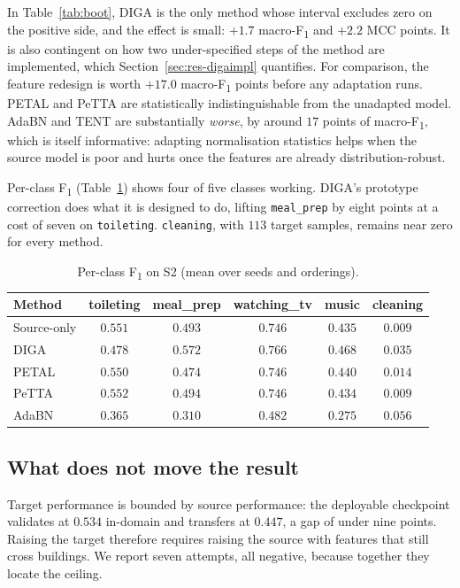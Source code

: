 \documentclass[a4paper,fleqn]{cas-dc}
\newcommand{\macf}{macro-F\textsubscript{1}}
\begin{document}
In Table~\ref{tab:boot}, DIGA is the only method whose interval excludes zero on the
positive side, and the effect is small: $+1.7$ \macf{} and $+2.2$ MCC points. It is also
contingent on how two under-specified steps of the method are implemented, which
Section~\ref{sec:res-digaimpl} quantifies. For comparison, the feature redesign is
worth $+17.0$ \macf{} points before any adaptation runs. PETAL and PeTTA are statistically
indistinguishable from the unadapted model. AdaBN and TENT are substantially
\emph{worse}, by around $17$ points of \macf{}, which is itself informative: adapting
normalisation statistics helps when the source model is poor and hurts once the features
are already distribution-robust.

Per-class F\textsubscript{1} (Table~\ref{tab:perclass}) shows four of five classes working.
DIGA's prototype correction does what it is designed to do, lifting \texttt{meal\_prep}
by eight points at a cost of seven on \texttt{toileting}. \texttt{cleaning}, with $113$
target samples, remains near zero for every method.

\begin{table}[t]
\centering
\caption{Per-class F\textsubscript{1} on S2 (mean over seeds and orderings).}
\label{tab:perclass}
\small
\begin{tabular}{lccccc}
\toprule
Method & toileting & meal\_prep & watching\_tv & music & cleaning \\
\midrule
Source-only & $0.551$ & $0.493$ & $0.746$ & $0.435$ & $0.009$ \\
DIGA        & $0.478$ & $\mathbf{0.572}$ & $\mathbf{0.766}$ & $\mathbf{0.468}$ & $0.035$ \\
PETAL       & $0.550$ & $0.474$ & $0.746$ & $0.440$ & $0.014$ \\
PeTTA       & $0.552$ & $0.494$ & $0.746$ & $0.434$ & $0.009$ \\
AdaBN       & $0.365$ & $0.310$ & $0.482$ & $0.275$ & $0.056$ \\
\bottomrule
\end{tabular}
\end{table}

\subsection{What does not move the result}
\label{sec:res-ceiling}

Target performance is bounded by source performance: the deployable checkpoint validates
at $0.534$ in-domain and transfers at $0.447$, a gap of under nine points. Raising the
target therefore requires raising the source with features that still cross buildings. We
report seven attempts, all negative, because together they locate the ceiling.
\end{document}
